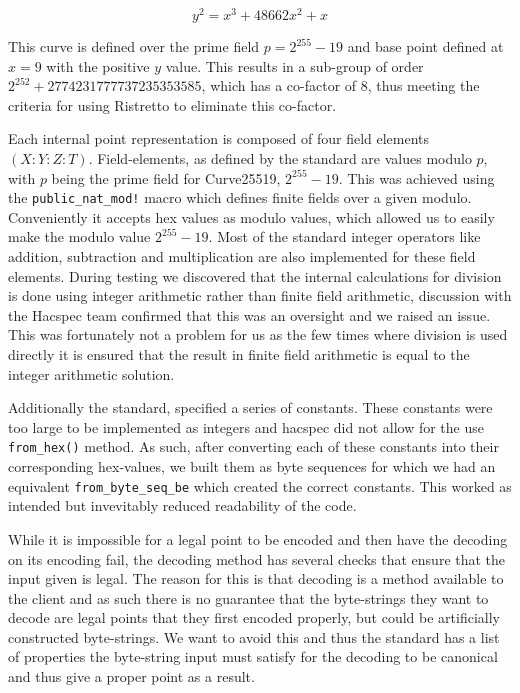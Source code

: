 \documentclass{article}
\begin{document}
$$y^2 = x^3 + 48662x^2 + x$$

This curve is defined over the prime field $p = 2^{255} - 19$ and base
point defined at $x = 9$ with the positive $y$ value. This results in a
sub-group of order $2^{252} + 2774231777737235353585$, which has a
co-factor of $8$, thus meeting the criteria for using Ristretto to eliminate this co-factor.

Each internal point representation is composed of four field elements
$(X : Y : Z : T)$. Field-elements, as defined by the standard are
values modulo $p$, with $p$ being the prime field for Curve25519,
$2^{255} - 19$. This was achieved using the \texttt{public\_nat\_mod!}
macro which defines finite fields over a given modulo. Conveniently it
accepts hex values as modulo values, which allowed us to easily make
the modulo value $2^{255} - 19$. Most of the standard integer operators
like addition, subtraction and multiplication are also implemented for
these field elements. During testing we discovered that the internal
calculations for division is done using integer arithmetic rather than
finite field arithmetic, discussion with the Hacspec team confirmed
that this was an oversight and we raised an issue. This was fortunately
not a problem for us as the few times where division is used directly
it is ensured that the result in finite field arithmetic is equal to
the integer arithmetic solution.

Additionally the standard, specified a series of constants. These
constants were too large to be implemented as integers and hacspec
did not allow for the use \texttt{from\_hex()} method. As such, after
converting each of these constants into their corresponding hex-values,
we built them as byte sequences for which we had an equivalent
\texttt{from\_byte\_seq\_be} which created the correct constants. This
worked as intended but invevitably reduced readability of the code.

While it is impossible for a legal point to be encoded and then have the
decoding on its encoding fail, the decoding method has several checks
that ensure that the input given is legal. The reason for this
is that decoding is a method available to the client and as such there
is no guarantee that the byte-strings they want to decode are legal
points that they first encoded properly, but could be artificially
constructed byte-strings. We want to avoid this and thus the standard
has a list of properties the byte-string input must satisfy for the
decoding to be canonical and thus give a proper point as a result.
\end{document}
